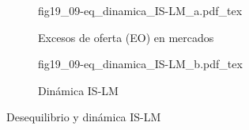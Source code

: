 \begin{figure}[h]
\captionsetup[subfigure]{belowskip=15pt}
\centering
\begin{subfigure}{.45\textwidth}
  \centering
        \def\svgwidth{\textwidth}
        {fig19_09-eq_dinamica_IS-LM_a.pdf_tex}
  \caption{Excesos de oferta (EO) en mercados}
  \label{fig19_09-eq_dinamica_IS-LM_a}
\end{subfigure}\hspace{.05\textwidth}
\begin{subfigure}{.45\textwidth}
  \centering
        \def\svgwidth{\textwidth}
        {fig19_09-eq_dinamica_IS-LM_b.pdf_tex}
  \caption{Dinámica IS-LM}
  \label{fig19_09-eq_dinamica_IS-LM_b}
\end{subfigure}
\caption{Desequilibrio y dinámica IS-LM}
\label{fig19_09-eq_dinamica_IS-LM}
\end{figure}